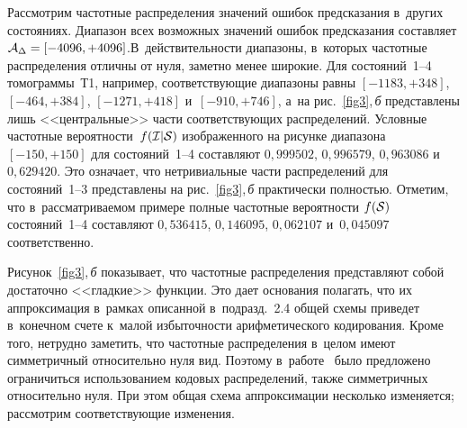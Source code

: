 \begin{multicols}{2}
Рассмотрим частотные распределения значений ошибок предсказания в~других состояниях. 
Диа\-пазон всех возможных значений ошибок пред\-сказания составляет ${\cal A}_{\Delta}\hm= 
[-4096,+4096]$.\linebreak В~действительности диапазоны, в~которых частот\-ные распределения 
отличны от нуля, заметно менее широкие. Для состояний~1--4 томограммы~Т1, например, 
соответствующие диапазоны равны $[-1183,+348]$, $[-464,+384]$, $[-1271,+418]$ 
и~$[-910,+746]$, а~на рис.~\ref{fig3},\,\textit{б} 
представлены лишь <<центральные>> час\-ти соответствующих распределений. 
Условные частотные вероятности~$f({\cal I}|{\cal S})$ изображенного на 
рисунке диапазона $[-150,+150]$ для состояний~1--4 составляют $0{,}999502$, 
$0{,}996579$, $0{,}963086$ и~$0{,}629420$. Это означает, что нетривиальные 
части распределений для состояний~1--3 представлены на рис.~\ref{fig3},\,\textit{б} 
практически полностью. Отметим, что в~рас\-смат\-ри\-ва\-емом примере полные 
частотные вероятности $f({\cal S})$ состояний~1--4 со\-став\-ля\-ют $0{,}536415$, 
$0{,}146095$, $0{,}062107$ и~$0{,}045097$ соответственно.

Рисунок~\ref{fig3},\,\textit{б} показывает, что частотные распределения 
представляют собой достаточно <<гладкие>> функции. Это дает основания 
полагать, что их аппроксимация в~рамках описанной 
в~подразд.~2.4 общей схемы приведет в~конечном счете к~малой избыточности 
арифметического кодирования.  Кроме того, нетрудно заметить, что частотные 
распределения в~целом имеют симметричный относительно нуля вид. 
Поэтому в~работе~\cite{b01} было предложено ограничиться использованием 
кодовых распределений, также симметричных относительно нуля. При этом общая 
схема аппроксимации несколько изменяется; рассмотрим соответствующие изменения.


\end{multicols}
